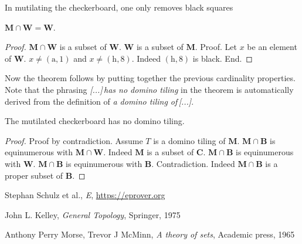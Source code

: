 \documentclass{article}
\newcommand{\fileA}{\mathrm{a}}
\newcommand{\fileH}{\mathrm{h}}
\newcommand{\Checkerboard}{\mathbf{C}}
\newcommand{\Mutilated}{\mathbf{M}}
\newcommand{\Black}{\mathbf{B}}
\newcommand{\White}{\mathbf{W}}
\begin{document}
\noindent In mutilating the checkerboard, one only removes black squares

\begin{forthel}
    \begin{lemma}
        $\Mutilated \cap \White = \White$.
    \end{lemma}
    \begin{proof}
        $\Mutilated \cap \White$ is a subset of $\White$.
        $\White$ is a subset of $\Mutilated$.
        Proof.
            Let $x$ be an element of $\White$.
            $x \neq (\fileA, 1)$ and $x \neq (\fileH,8)$.
            Indeed $(\fileH, 8)$ is black.
        End.
    \end{proof}
\end{forthel}

\noindent Now the theorem follows by putting together the previous cardinality properties.
Note that the phrasing \textit{[...]\,has no domino tiling} in the theorem is automatically
derived from the definition of \textit{a domino tiling of\,[...]}.

\begin{forthel}
    \begin{theorem}
        The mutilated checkerboard has no domino tiling.
    \end{theorem}
    \begin{proof}
        Proof by contradiction.
        Assume $T$ is a domino tiling of $\Mutilated$.
        $\Mutilated \cap \Black$ is equinumerous with $\Mutilated \cap \White$.
        Indeed $\Mutilated$ is a subset of $\Checkerboard$.
        $\Mutilated \cap \Black$ is equinumerous with $\White$.
        $\Mutilated \cap \Black$ is equinumerous with $\Black$.
        Contradiction. Indeed $\Mutilated \cap \Black$ is a proper subset of $\Black$.
    \end{proof}
\end{forthel}

\begin{thebibliography}{1}

 Stephan Schulz et al., \textit{E}, \url{https://eprover.org}

 John L. Kelley, \textit{General Topology}, Springer, 1975

 Anthony Perry Morse, Trevor J McMinn, \textit{A theory of sets}, Academic press, 1965

\end{thebibliography}
\end{document}
